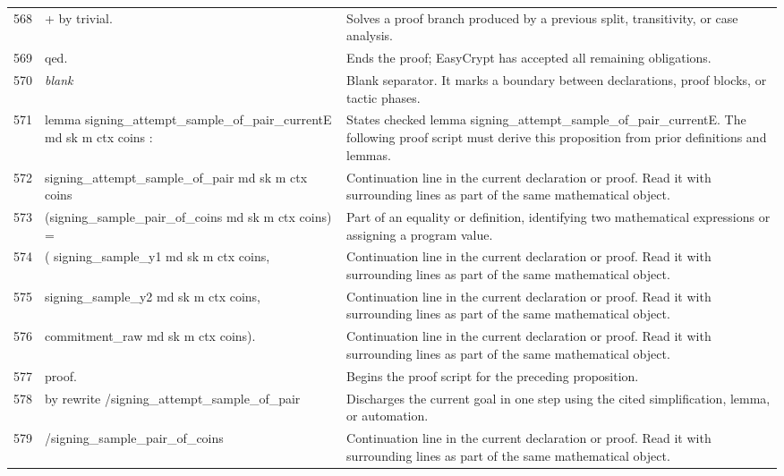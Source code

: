 \documentclass[10pt]{article}
\begin{document}
\begin{longtable}{r L{0.53\textwidth} L{0.37\textwidth}}
568 & {\ttfamily\scriptsize + by trivial.} & Solves a proof branch produced by a previous split, transitivity, or case analysis. \\
569 & {\ttfamily\scriptsize qed.} & Ends the proof; EasyCrypt has accepted all remaining obligations. \\
570 & {\ttfamily\scriptsize \emph{blank}} & Blank separator.  It marks a boundary between declarations, proof blocks, or tactic phases. \\
571 & {\ttfamily\scriptsize lemma signing\_attempt\_sample\_of\_pair\_currentE md sk m ctx coins :} & States checked lemma signing\_attempt\_sample\_of\_pair\_currentE.  The following proof script must derive this proposition from prior definitions and lemmas. \\
572 & {\ttfamily\scriptsize   signing\_attempt\_sample\_of\_pair md sk m ctx coins} & Continuation line in the current declaration or proof.  Read it with surrounding lines as part of the same mathematical object. \\
573 & {\ttfamily\scriptsize     (signing\_sample\_pair\_of\_coins md sk m ctx coins) =} & Part of an equality or definition, identifying two mathematical expressions or assigning a program value. \\
574 & {\ttfamily\scriptsize   ( signing\_sample\_y1 md sk m ctx coins,} & Continuation line in the current declaration or proof.  Read it with surrounding lines as part of the same mathematical object. \\
575 & {\ttfamily\scriptsize     signing\_sample\_y2 md sk m ctx coins,} & Continuation line in the current declaration or proof.  Read it with surrounding lines as part of the same mathematical object. \\
576 & {\ttfamily\scriptsize     commitment\_raw md sk m ctx coins).} & Continuation line in the current declaration or proof.  Read it with surrounding lines as part of the same mathematical object. \\
577 & {\ttfamily\scriptsize proof.} & Begins the proof script for the preceding proposition. \\
578 & {\ttfamily\scriptsize by rewrite /signing\_attempt\_sample\_of\_pair} & Discharges the current goal in one step using the cited simplification, lemma, or automation. \\
579 & {\ttfamily\scriptsize            /signing\_sample\_pair\_of\_coins} & Continuation line in the current declaration or proof.  Read it with surrounding lines as part of the same mathematical object. \\

\end{longtable}
\end{document}
